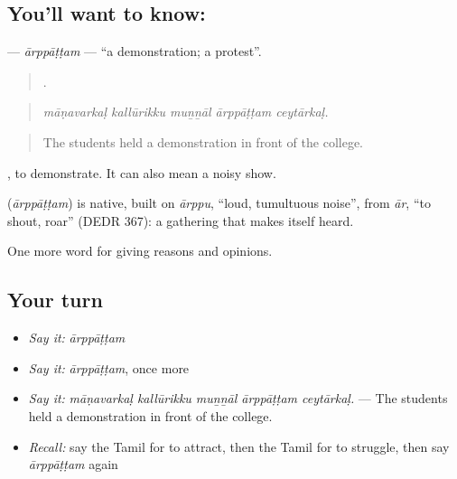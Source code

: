 \subsection*{You'll want to know: }
\textbf{} — \emph{ārppāṭṭam} — \textquotedblleft{}a demonstration; a protest\textquotedblright{}.

\begin{quote}
    .
\end{quote}

\begin{quote}
\emph{māṇavarkaḷ kallūrikku muṉṉāl ārppāṭṭam ceytārkaḷ.}
\end{quote}

\begin{quote}
The students held a demonstration in front of the college.
\end{quote}

 , to demonstrate. It can also mean a noisy show.

\begin{cousinweb}
\textbf{} (\emph{ārppāṭṭam}) is native, built on \emph{ārppu}, \textquotedblleft{}loud, tumultuous noise\textquotedblright{}, from \emph{ār}, \textquotedblleft{}to shout, roar\textquotedblright{} (DEDR 367): a gathering that makes itself heard.
\end{cousinweb}

\begin{grammarlens}[title={What you've built}]
One more word for giving reasons and opinions.
\end{grammarlens}

\subsection*{Your turn}
\begin{itemize}
\raggedright
  \item \emph{Say it:} \emph{ārppāṭṭam}
  \item \emph{Say it:} \emph{ārppāṭṭam}, once more
  \item \emph{Say it:} \emph{māṇavarkaḷ kallūrikku muṉṉāl ārppāṭṭam ceytārkaḷ.} — The students held a demonstration in front of the college.
  \item \emph{Recall:} say the Tamil for to attract, then the Tamil for to struggle, then say \emph{ārppāṭṭam} again
\end{itemize}

